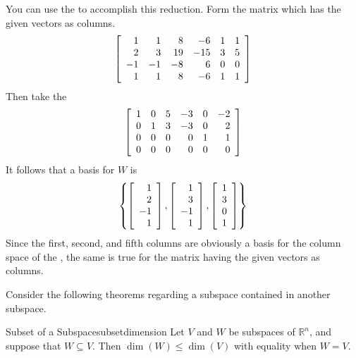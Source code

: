 \begin{solution}
You can use the {\rref} to accomplish this reduction. Form
the matrix which has the given vectors as columns. 
\begin{equation*}
\left[
\begin{array}{rrrrrr}
1 & 1 & 8 & -6 & 1 & 1 \\ 
2 & 3 & 19 & -15 & 3 & 5 \\ 
-1 & -1 & -8 & 6 & 0 & 0 \\ 
1 & 1 & 8 & -6 & 1 & 1
\end{array}
\right]
\end{equation*}
Then take the {\rref}
\begin{equation*}
\left[
\begin{array}{rrrrrr}
1 & 0 & 5 & -3 & 0 & -2 \\ 
0 & 1 & 3 & -3 & 0 & 2 \\ 
0 & 0 & 0 & 0 & 1 & 1 \\ 
0 & 0 & 0 & 0 & 0 & 0
\end{array}
\right]
\end{equation*}
It follows that a basis for $W$ is 
\begin{equation*}
\left\{ \left[ 
\begin{array}{r}
1 \\ 
2 \\ 
-1 \\ 
1
\end{array}
\right] ,\left[ 
\begin{array}{r}
1 \\ 
3 \\ 
-1 \\ 
1
\end{array}
\right] ,\left[ 
\begin{array}{c}
1 \\ 
3 \\ 
0 \\ 
1
\end{array}
\right] \right\}
\end{equation*}
Since the first, second, and fifth columns are
obviously a basis for the column space of the {\rref}, the same
is true for the matrix having the given vectors as columns. 
\end{solution}

Consider the following theorems regarding a subspace contained in another subspace. 

\begin{theorem}{Subset of a Subspace}{subsetdimension}
Let $V$ and $W$ be subspaces of $\mathbb{R}^n$, and suppose that $W\subseteq V$.
Then  $\dim(W) \leq \dim(V)$ with equality when $W=V$.
\end{theorem}


